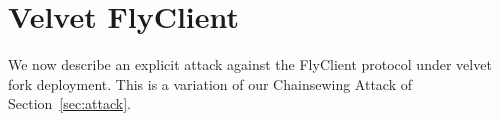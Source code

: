 \section{Velvet FlyClient}
\label{sec:flyclient}
We now describe an explicit attack against
the FlyClient protocol under velvet fork deployment.
This is a variation of our Chainsewing Attack of Section~\ref{sec:attack}.

%
